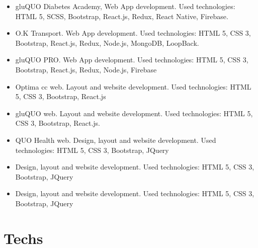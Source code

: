 \documentclass[11pt,a4paper]{moderncv}
\begin{document}
    {\begin{itemize}
         \item gluQUO Diabetes Academy, Web App development. Used technologies: HTML 5, SCSS, Bootstrap, React.js, Redux, React Native, Firebase.
         \item O.K Transport. Web App development. Used technologies: HTML 5, CSS 3, Bootstrap, React.js, Redux, Node.js, MongoDB, LoopBack.
         \item gluQUO PRO. Web App development. Used technologies: HTML 5, CSS 3, Bootstrap, React.js, Redux, Node.js, Firebase
         \item Optima cc web. Layout and website development. Used technologies: HTML 5, CSS 3, Bootstrap, React.js
         \item gluQUO web. Layout and website development. Used technologies: HTML 5, CSS 3, Bootstrap, React.js.
         \item QUO Health web. Design, layout and website development. Used technologies: HTML 5, CSS 3, Bootstrap, JQuery
    \end{itemize}
    }
    {
        \begin{itemize}
            \item Design, layout and website development. Used technologies: HTML 5, CSS 3, Bootstrap, JQuery
        \end{itemize}
        \begin{itemize}
            \item Design, layout and website development. Used technologies: HTML 5, CSS 3, Bootstrap, JQuery
        \end{itemize}
    }

    \section{Techs}
\end{document}
